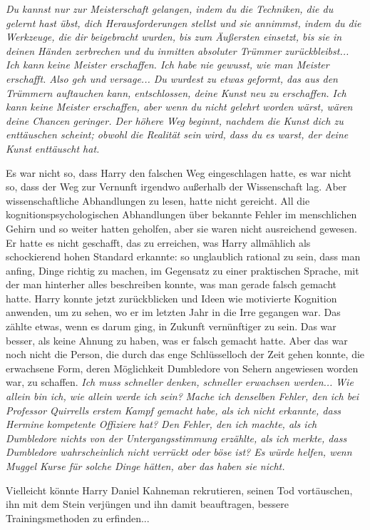 \emph{Du kannst nur zur Meisterschaft gelangen, indem du die Techniken, die du gelernt hast übst, dich Herausforderungen stellst und sie annimmst, indem du die Werkzeuge, die dir beigebracht wurden, bis zum Äußersten einsetzt, bis sie in deinen Händen zerbrechen und du inmitten absoluter Trümmer zurückbleibst... Ich kann keine Meister erschaffen. Ich habe nie gewusst, wie man Meister erschafft. Also geh und versage... Du wurdest zu etwas geformt, das aus den Trümmern auftauchen kann, entschlossen, deine Kunst neu zu erschaffen. Ich kann keine Meister erschaffen, aber wenn du nicht gelehrt worden wärst, wären deine Chancen geringer. Der höhere Weg beginnt, nachdem die Kunst dich zu enttäuschen scheint; obwohl die Realität sein wird, dass du es warst, der deine Kunst enttäuscht hat. }

Es war nicht so, dass Harry den falschen Weg eingeschlagen hatte, es war nicht
so, dass der Weg zur Vernunft irgendwo außerhalb der Wissenschaft lag. Aber
wissenschaftliche Abhandlungen zu lesen, hatte nicht gereicht. All die
kognitionspsychologischen Abhandlungen über bekannte Fehler im menschlichen
Gehirn und so weiter hatten geholfen, aber sie waren nicht ausreichend gewesen.
Er hatte es nicht geschafft, das zu erreichen, was Harry allmählich als
schockierend hohen Standard erkannte: so unglaublich rational zu sein, dass man
anfing, Dinge richtig zu machen, im Gegensatz zu einer praktischen Sprache, mit
der man hinterher alles beschreiben konnte, was man gerade falsch gemacht hatte.
Harry konnte jetzt zurückblicken und Ideen wie \glqq motivierte Kognition\grqq{}
anwenden, um zu sehen, wo er im letzten Jahr in die Irre gegangen war. Das
zählte etwas, wenn es darum ging, in Zukunft vernünftiger zu sein. Das war
besser, als keine Ahnung zu haben, was er falsch gemacht hatte. Aber das war
noch nicht die Person, die durch das enge Schlüsselloch der Zeit gehen konnte,
die erwachsene Form, deren Möglichkeit Dumbledore von Sehern angewiesen worden
war, zu schaffen. \emph{ Ich muss schneller denken, schneller erwachsen
werden... }
\emph{Wie allein bin ich, wie allein werde ich sein? }
\emph{Mache ich denselben Fehler, den ich bei Professor Quirrells erstem Kampf gemacht habe, als ich nicht erkannte, dass Hermine kompetente Offiziere hat? Den Fehler, den ich machte, als ich Dumbledore nichts von der Untergangsstimmung erzählte, als ich merkte, dass Dumbledore wahrscheinlich nicht verrückt oder böse ist? Es würde helfen, wenn Muggel Kurse für solche Dinge hätten, aber das haben sie nicht.}

Vielleicht könnte Harry Daniel Kahneman rekrutieren, seinen Tod vortäuschen, ihn
mit dem Stein verjüngen und ihn damit beauftragen, bessere Trainingsmethoden zu
erfinden...

